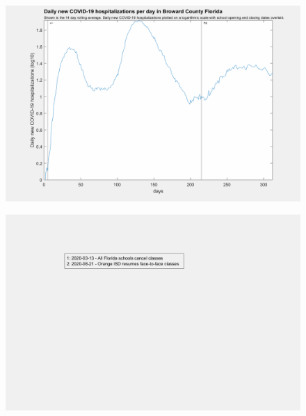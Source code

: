 \documentclass[]{article}
\begin{document}
\begin{figure}[!h]
	\includegraphics[width=\linewidth]{images/broward_hospitalizations_school_log.png}
	\caption{}
	\label{fig:images/broward_hospitalizations_school_logLabel}
\end{figure}

\begin{figure}[!h]
	\includegraphics[width=\linewidth]{legends/orange_school_legend.png}
	\caption{}
	\label{fig:legends/orange_school_legendLabel}
\end{figure}
\end{document}
